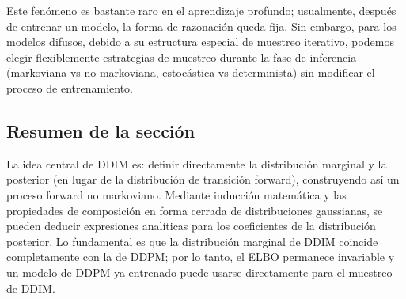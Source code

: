 Este fenómeno es bastante raro en el aprendizaje profundo; usualmente, después de entrenar un modelo, la forma de razonación queda fija. Sin embargo, para los modelos difusos, debido a su estructura especial de muestreo iterativo, podemos elegir flexiblemente estrategias de muestreo durante la fase de inferencia (markoviana vs no markoviana, estocástica vs determinista) sin modificar el proceso de entrenamiento.

\subsection{Resumen de la sección}

La idea central de DDIM es: definir directamente la distribución marginal y la posterior (en lugar de la distribución de transición forward), construyendo así un proceso forward no markoviano. Mediante inducción matemática y las propiedades de composición en forma cerrada de distribuciones gaussianas, se pueden deducir expresiones analíticas para los coeficientes de la distribución posterior. Lo fundamental es que la distribución marginal de DDIM coincide completamente con la de DDPM; por lo tanto, el ELBO permanece invariable y un modelo de DDPM ya entrenado puede usarse directamente para el muestreo de DDIM.
